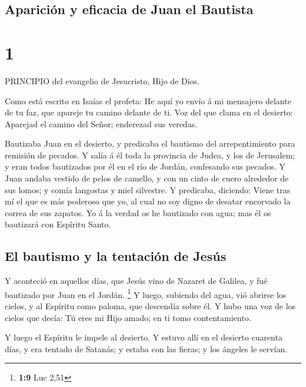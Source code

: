 \hypertarget{apariciuxf3n-y-eficacia-de-juan-el-bautista}{%
\subsection{Aparición y eficacia de Juan el
Bautista}\label{apariciuxf3n-y-eficacia-de-juan-el-bautista}}

\hypertarget{section}{%
\section{1}\label{section}}

 PRINCIPIO del evangelio de Jesucristo, Hijo de Dios.

 Como está escrito en Isaías el profeta: He aquí yo envío á
mi mensajero delante de tu faz, que apareje tu camino delante de ti.
 Voz del que clama en el desierto: Aparejad el camino del
Señor; enderezad sus veredas.

 Bautizaba Juan en el desierto, y predicaba el bautismo del
arrepentimiento para remisión de pecados.  Y salía á él toda
la provincia de Judea, y los de Jerusalem; y eran todos bautizados por
él en el río de Jordán, confesando sus pecados.  Y Juan
andaba vestido de pelos de camello, y con un cinto de cuero alrededor de
sus lomos; y comía langostas y miel silvestre.  Y predicaba,
diciendo: Viene tras mí el que es más poderoso que yo, al cual no soy
digno de desatar encorvado la correa de sus zapatos.  Yo á
la verdad os he bautizado con agua; mas él os bautizará con Espíritu
Santo.

\hypertarget{el-bautismo-y-la-tentaciuxf3n-de-jesuxfas}{%
\subsection{El bautismo y la tentación de
Jesús}\label{el-bautismo-y-la-tentaciuxf3n-de-jesuxfas}}

 Y aconteció en aquellos días, que Jesús vino de Nazaret de
Galilea, y fué bautizado por Juan en el Jordán. \footnote{\textbf{1:9}
  Luc 2,51}  Y luego, subiendo del agua, vió abrirse los
cielos, y al Espíritu como paloma, que descendía sobre él. 
Y hubo una voz de los cielos que decía: Tú eres mi Hijo amado; en ti
tomo contentamiento.

 Y luego el Espíritu le impele al desierto.  Y
estuvo allí en el desierto cuarenta días, y era tentado de Satanás; y
estaba con las fieras; y los ángeles le servían.

